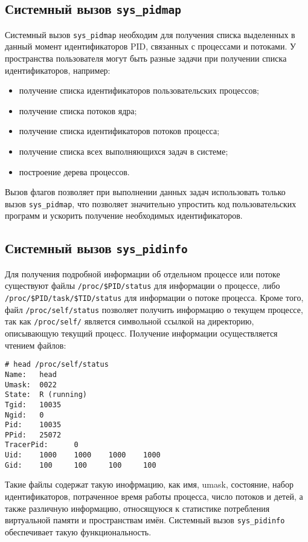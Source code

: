 \subsection{Системный вызов \texttt{sys\_pidmap}}
\label{sub:sys:sys_pidmap}

Системный вызов \texttt{sys\_pidmap} необходим для получения списка выделенных в
данный момент идентификаторов PID, связанных с процессами и потоками. У
пространства пользователя могут быть разные задачи при получении списка
идентификаторов, например:
\begin{itemize}
\item получение списка идентификаторов пользовательских процессов;
\item получение списка потоков ядра;
\item получение списка идентификаторов потоков процесса;
\item получение списка всех выполняющихся задач в системе;
\item построение дерева процессов.
\end{itemize}

Вызов флагов позволяет при выполнении данных задач использовать только вызов
\texttt{sys\_pidmap}, что позволяет значительно упростить код пользовательских
программ и ускорить получение необходимых идентификаторов.

\subsection{Системный вызов \texttt{sys\_pidinfo}}
\label{sub:sys:sys_pidinfo}

Для получения подробной информации об отдельном процессе или потоке существуют
файлы \texttt{/proc/\$PID/status} для информации о процессе, либо
\texttt{/proc/\$PID/task/\$TID/status} для информации о потоке процесса. Кроме
того, файл \texttt{/proc/self/status} позволяет получить информацию о текущем
процессе, так как \texttt{/proc/self/} является символьной ссылкой на
директорию, описывающую текущий процесс. Получение информации осуществляется
чтением файлов:

\medskip
\begin{lstlisting}[style=cstyle]
# head /proc/self/status
Name:   head
Umask:  0022
State:  R (running)
Tgid:   10035
Ngid:   0
Pid:    10035
PPid:   25072
TracerPid:      0
Uid:    1000    1000    1000    1000
Gid:    100     100     100     100
\end{lstlisting}
\medskip

Такие файлы содержат такую инофрмацию, как имя, umask, состояние, набор
идентификаторов, потраченное время работы процесса, число потоков и детей, а
также различную информацию, относящуюся к статистике потребления виртуальной
памяти и пространствам имён. Системный вызов \texttt{sys\_pidinfo} обеспечивает
такую функциональность.

